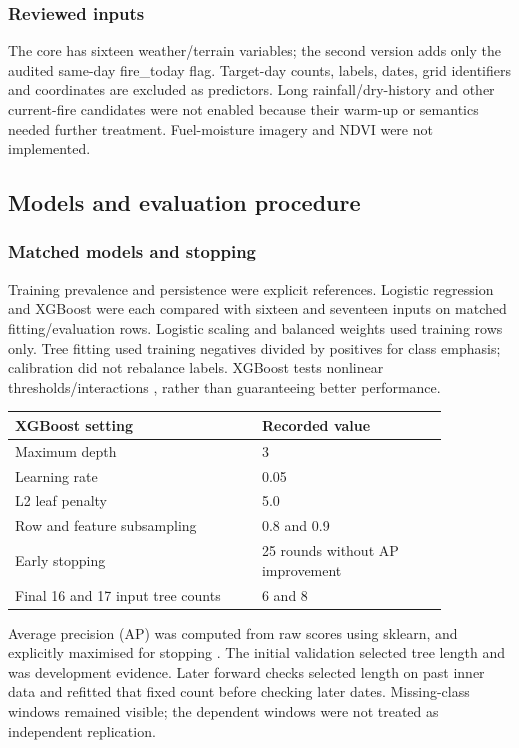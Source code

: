 \subsubsection*{Reviewed inputs}

The core has sixteen weather/terrain variables; the second version adds only the audited same-day fire\_today flag. Target-day counts, labels, dates, grid identifiers and coordinates are excluded as predictors. Long rainfall/dry-history and other current-fire candidates were not enabled because their warm-up or semantics needed further treatment. Fuel-moisture imagery and NDVI were not implemented.

\subsection{Models and evaluation procedure}

\subsubsection*{Matched models and stopping}

Training prevalence and persistence were explicit references. Logistic regression and XGBoost were each compared with sixteen and seventeen inputs on matched fitting/evaluation rows. Logistic scaling and balanced weights used training rows only. Tree fitting used training negatives divided by positives for class emphasis; calibration did not rebalance labels. XGBoost tests nonlinear thresholds/interactions \cite{mlChen2016}, rather than guaranteeing better performance.

\begin{center}\small\setlength{\tabcolsep}{3pt}
\begin{tabular}{p{0.490\linewidth}p{0.370\linewidth}}
\hline
XGBoost setting & Recorded value \\ \hline
Maximum depth & 3 \\
Learning rate & 0.05 \\
L2 leaf penalty & 5.0 \\
Row and feature subsampling & 0.8 and 0.9 \\
Early stopping & 25 rounds without AP improvement \\
Final 16 and 17 input tree counts & 6 and 8 \\
\hline\end{tabular}\end{center}

Average precision (AP) was computed from raw scores using sklearn, and explicitly maximised for stopping \cite{mlAveragePrecision}. The initial validation selected tree length and was development evidence. Later forward checks selected length on past inner data and refitted that fixed count before checking later dates. Missing-class windows remained visible; the dependent windows were not treated as independent replication.


